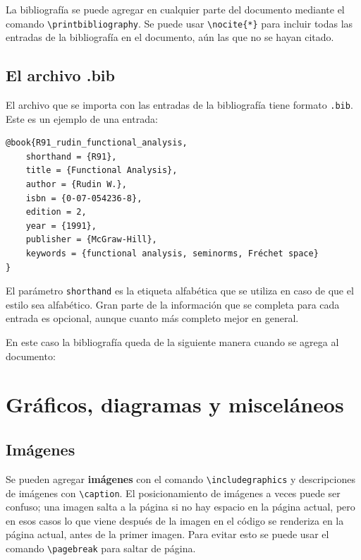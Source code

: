 \documentclass[12pt, spanish]{article}
\theoremstyle{definition} %
\theoremstyle{remark} %
\theoremstyle{plain} %
\theoremstyle{plain} %
\theoremstyle{plain} %
\theoremstyle{plain} %
\theoremstyle{plain} %
\theoremstyle{remark} %
\begin{document}
La bibliografía se puede agregar en cualquier parte del documento mediante el comando \verb|\printbibliography|. Se puede usar \verb|\nocite{*}| para incluir todas las entradas de la bibliografía en el documento, aún las que no se hayan citado.

\subsection{El archivo .bib}

El archivo que se importa con las entradas de la bibliografía tiene formato \verb|.bib|. Este es un ejemplo de una entrada:
\begin{verbatim}
@book{R91_rudin_functional_analysis,
    shorthand = {R91},
    title = {Functional Analysis},
    author = {Rudin W.},
    isbn = {0-07-054236-8},
    edition = 2,
    year = {1991},
    publisher = {McGraw-Hill},
    keywords = {functional analysis, seminorms, Fréchet space}
}
\end{verbatim}
El parámetro \verb|shorthand| es la etiqueta alfabética que se utiliza en caso de que el estilo sea alfabético. Gran parte de la información que se completa para cada entrada es opcional, aunque cuanto más completo mejor en general.

En este caso la bibliografía queda de la siguiente manera cuando se agrega al documento:

\printbibliography[
    title=Bibliografía, %
]




\section{Gráficos, diagramas y misceláneos}

\subsection{Imágenes}

Se pueden agregar \textbf{imágenes} con el comando \verb|\includegraphics| y descripciones de imágenes con \verb|\caption|. El posicionamiento de imágenes a veces puede ser confuso; una imagen salta a la página si no hay espacio en la página actual, pero en esos casos lo que viene después de la imagen en el código se renderiza en la página actual, antes de la primer imagen. Para evitar esto se puede usar el comando \verb|\pagebreak| para saltar de página.
\end{document}

